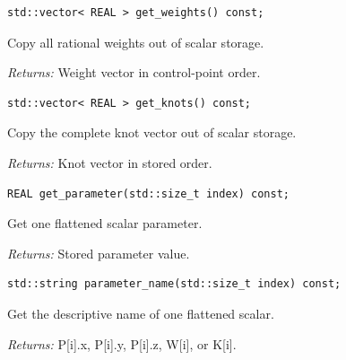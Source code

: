 \par\noindent\begin{minipage}{\linewidth}
\begin{lstlisting}[style=apireference]
std::vector< REAL > get_weights() const;
\end{lstlisting}
{\footnotesize Copy all rational weights out of scalar storage.\par}
{\footnotesize\textit{Returns:} Weight vector in control-point order.\par}
\end{minipage}\par\vspace{1pt}
\par\noindent\begin{minipage}{\linewidth}
\begin{lstlisting}[style=apireference]
std::vector< REAL > get_knots() const;
\end{lstlisting}
{\footnotesize Copy the complete knot vector out of scalar storage.\par}
{\footnotesize\textit{Returns:} Knot vector in stored order.\par}
\end{minipage}\par\vspace{1pt}
\par\noindent\begin{minipage}{\linewidth}
\begin{lstlisting}[style=apireference]
REAL get_parameter(std::size_t index) const;
\end{lstlisting}
{\footnotesize Get one flattened scalar parameter.\par}
{\footnotesize\textit{Returns:} Stored parameter value.\par}
\end{minipage}\par\vspace{1pt}
\par\noindent\begin{minipage}{\linewidth}
\begin{lstlisting}[style=apireference]
std::string parameter_name(std::size_t index) const;
\end{lstlisting}
{\footnotesize Get the descriptive name of one flattened scalar.\par}
{\footnotesize\textit{Returns:} P[i].x, P[i].y, P[i].z, W[i], or K[i].\par}
\end{minipage}\par\vspace{1pt}
